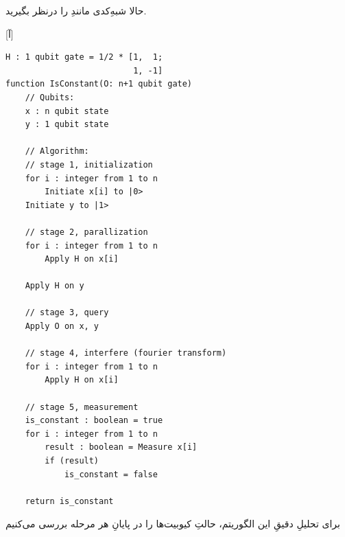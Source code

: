 حالا شبهِ‌کدی مانندِ  را درنظر بگیرید.

[آ]
\begin{latin}
\begin{lstlisting}
H : 1 qubit gate = 1/2 * [1,  1;
                          1, -1]
function IsConstant(O: n+1 qubit gate)   
    // Qubits:
    x : n qubit state
    y : 1 qubit state

    // Algorithm:
    // stage 1, initialization
    for i : integer from 1 to n
        Initiate x[i] to |0>
    Initiate y to |1>

    // stage 2, parallization
    for i : integer from 1 to n
        Apply H on x[i]
       
    Apply H on y
        
    // stage 3, query
    Apply O on x, y
    
    // stage 4, interfere (fourier transform)
    for i : integer from 1 to n
        Apply H on x[i]

    // stage 5, measurement
    is_constant : boolean = true
    for i : integer from 1 to n
        result : boolean = Measure x[i]
        if (result)
            is_constant = false
            
    return is_constant
\end{lstlisting}
\end{latin}

برای تحلیلِ دقیقِ این الگوریتم، حالتِ کیوبیت‌ها را در پایانِ هر مرحله بررسی می‌کنیم

